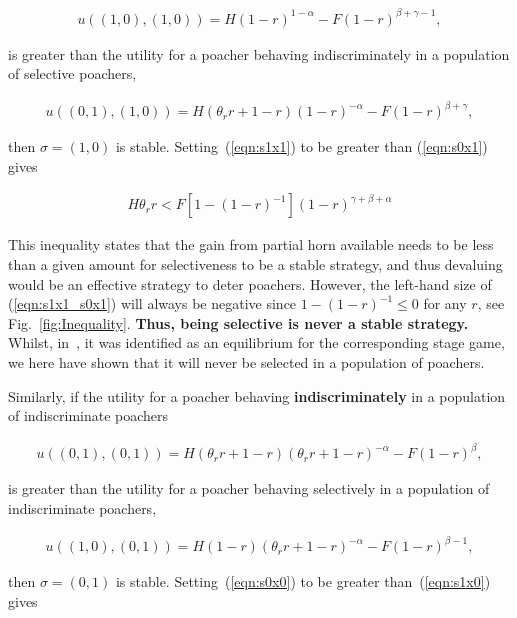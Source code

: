 \documentclass[10pt]{article}
\begin{document}
\begin{eqnarray}
\label{eqn:s1x1}
 u((1, 0),(1, 0)) = H(1 - r)^{1 - \alpha} - F(1 - r)^{\beta + \gamma - 1},
\end{eqnarray}

is greater than the utility for a poacher behaving indiscriminately in a population
of selective poachers,

\begin{eqnarray}
\label{eqn:s0x1}
u((0, 1),(1, 0)) = H(\theta_r r +1 - r)(1 - r)^{-\alpha} - F(1 - r)^{\beta + \gamma} ,
\end{eqnarray}

then \(\sigma = (1, 0)\) is stable. Setting~(\ref{eqn:s1x1}) to be greater than (\ref{eqn:s0x1})
gives

\begin{eqnarray}
\label{eqn:s1x1_s0x1}
H \theta_r r < F [1 - (1 - r)^{-1}](1 - r)^{\gamma + \beta + \alpha}
\end{eqnarray}

This inequality states that the gain from partial horn available needs to be less
than a given amount for selectiveness to be a stable strategy, and thus devaluing
would be  an effective strategy to deter poachers. However, the left-hand size 
of (\ref{eqn:s1x1_s0x1}) will always be negative since \(1-(1-r)^{-1} \leq 0\)
for any \(r\), see Fig.~\ref{fig:Inequality}. \textbf{Thus, being selective is never
a stable strategy.} Whilst, in~\cite{Lee}, it was identified as an equilibrium for
the corresponding stage game, we here have shown that it will never be selected
in a population of poachers.

Similarly, if the utility for a poacher behaving \textbf{indiscriminately} in a population
of indiscriminate poachers

\begin{eqnarray}
\label{eqn:s0x0}
 u((0, 1), (0, 1)) = H(\theta_r r + 1 - r)(\theta_r r + 1 - r)^{-\alpha}  - F(1 - r)^{\beta},
\end{eqnarray}

is greater than the utility for a poacher behaving selectively in a population of 
indiscriminate poachers,

\begin{eqnarray}
\label{eqn:s1x0}
u((1, 0),(0, 1)) = H(1 - r)(\theta_r r + 1 - r)^{-\alpha} - F(1 - r)^{\beta-1},
\end{eqnarray}

then \(\sigma = (0, 1)\) is stable. Setting~(\ref{eqn:s0x0}) to be greater 
than~(\ref{eqn:s1x0}) gives
\end{document}
